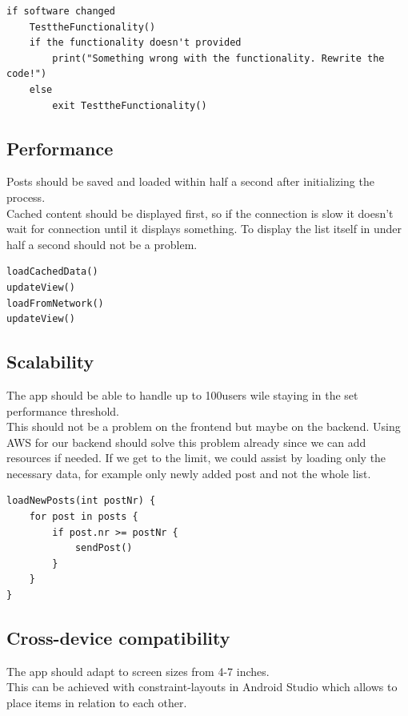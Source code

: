 \documentclass[conference]{IEEEtran}
\numberwithin{figure}{subsection}
\begin{document}
\begin{lstlisting}
if software changed
	TesttheFunctionality()
	if the functionality doesn't provided
		print("Something wrong with the functionality. Rewrite the code!")
	else
		exit TesttheFunctionality()
\end{lstlisting}



\subsection{Performance}
Posts  should  be  saved  and  loaded  within half a second after initializing the process.\\

Cached content should be displayed first, so if the connection is slow it doesn't wait for connection until it displays something. To display the list itself in under half a second should not be a problem.

\begin{lstlisting}
loadCachedData()
updateView()
loadFromNetwork()
updateView()
\end{lstlisting}


\subsection{Scalability}
The app should be able to handle up to 100users wile staying in the set performance threshold.\\

This should not be a problem on the frontend but maybe on the backend. Using AWS for our backend should solve this problem already since we can add resources if needed. If we get to the limit, we could assist by loading only the necessary data, for example only newly added post and not the whole list.

\begin{lstlisting}
loadNewPosts(int postNr) {
    for post in posts {
        if post.nr >= postNr {
            sendPost()
        }
    }
}
\end{lstlisting}


\subsection{Cross-device compatibility}
The  app  should  adapt  to  screen  sizes from 4-7 inches.\\

This can be achieved with constraint-layouts in Android Studio which allows to place items in relation to each other.\\
\end{document}
